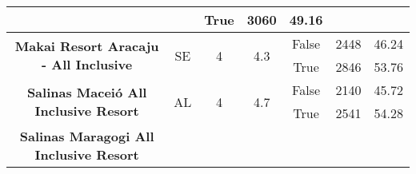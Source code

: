 \begin{table}[]
{\begin{tabular}{|c|c|c|c|c|r|r|}
			                                                                &
			                                                                &
			True                                                            &
			3060                                                            &
			49.16                                                             \\ \hline
			\multirow{2}{*}{\textbf{Makai Resort Aracaju - All Inclusive}}  &
			\multirow{2}{*}{SE}                                             &
			\multirow{2}{*}{4}                                              &
			\multirow{2}{*}{4.3}                                            &
			False                                                           &
			2448                                                            &
			46.24                                                             \\ \cline{5-7}
			                                                                &
			                                                                &
			                                                                &
			                                                                &
			True                                                            &
			2846                                                            &
			53.76                                                             \\ \hline
			\multirow{2}{*}{\textbf{Salinas Maceió All Inclusive Resort}}   &
			\multirow{2}{*}{AL}                                             &
			\multirow{2}{*}{4}                                              &
			\multirow{2}{*}{4.7}                                            &
			False                                                           &
			2140                                                            &
			45.72                                                             \\ \cline{5-7}
			                                                                &
			                                                                &
			                                                                &
			                                                                &
			True                                                            &
			2541                                                            &
			54.28                                                             \\ \hline
			\multirow{2}{*}{\textbf{Salinas Maragogi All Inclusive Resort}} &

\end{tabular}}
\end{table}

